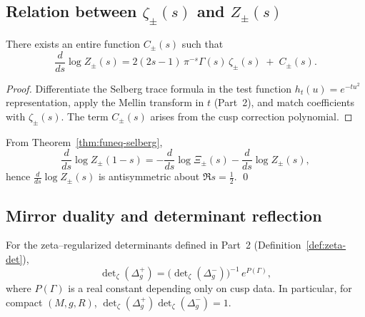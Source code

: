 
\subsection{Relation between $\zeta_\pm(s)$ and $Z_\pm(s)$}
\label{subsec:ch6-part4-zeta-vs-Z} \relax \hspace{0pt}
\begin{proposition}
\label{prop:zeta-vs-Z}
There exists an entire function $C_\pm(s)$ such that
\[
\frac{d}{ds}\log Z_\pm(s)
=2(2s-1)\,\pi^{-s}\Gamma(s)\,\zeta_\pm(s)\;+\;C_\pm(s).
\]
\end{proposition}

\begin{proof}
Differentiate the Selberg trace formula in the test function $h_t(u)=e^{-tu^2}$ representation, apply the Mellin transform in $t$ (Part~2), and match coefficients with $\zeta_\pm(s)$. The term $C_\pm(s)$ arises from the cusp correction polynomial.  %
\end{proof}

\begin{corollary}
\label{cor:logZ}
From Theorem~\ref{thm:funeq-selberg},
\[
\frac{d}{ds}\log Z_\pm(1-s)
= -\frac{d}{ds}\log \Xi_\pm(s)
-\frac{d}{ds}\log Z_\pm(s),
\]
hence $\frac{d}{ds}\log Z_\pm(s)$ is antisymmetric about $\Re s=\tfrac12$. \qed {} %
\end{corollary}


\subsection{Mirror duality and determinant reflection}
\label{subsec:ch6-part4-mirror-dual} \relax \hspace{0pt}
\begin{theorem}
\label{thm:dual-det}
For the zeta–regularized determinants defined in Part~2 (Definition~\ref{def:zeta-det}),
\[
\det\nolimits_\zeta(\Delta_g^+)
=\big(\det\nolimits_\zeta(\Delta_g^-)\big)^{-1}\,e^{P(\Gamma)},
\]
where $P(\Gamma)$ is a real constant depending only on cusp data. In particular, for compact $(M,g,R)$, $\det_\zeta(\Delta_g^+)\det_\zeta(\Delta_g^-)=1$.  %
\end{theorem}

